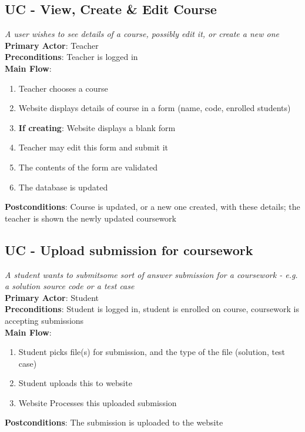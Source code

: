 \documentclass[a4paper,11pt]{report}
\begin{document}
\subsection*{UC - View, Create \& Edit Course}
\textit{A user wishes to see details of a course, possibly edit it, or create a new one}\\
\textbf{Primary Actor}: Teacher\\
\textbf{Preconditions}: Teacher is logged in\\
\textbf{Main Flow}:
\begin{enumerate}
\item Teacher chooses a course
\item Website displays details of course in a form (name, code, enrolled students)
\item \textbf{If creating}: Website displays a blank form
\item Teacher may edit this form and submit it
\item The contents of the form are validated
\item The database is updated
\end{enumerate}
\textbf{Postconditions}: Course is updated, or a new one created, with these details; the teacher is shown the newly updated coursework

\subsection*{UC - Upload submission for coursework}
\textit{A student wants to submitsome sort of answer submission for a coursework - e.g. a solution source code or a test case}\\
\textbf{Primary Actor}: Student\\
\textbf{Preconditions}: Student is logged in, student is enrolled on course, coursework is accepting submissions\\
\textbf{Main Flow}:
\begin{enumerate}
\item Student picks file(s) for submission, and the type of the file (solution, test case)
\item Student uploads this to website
\item Website Processes this uploaded submission
\end{enumerate}
\textbf{Postconditions}: The submission is uploaded to the website
\end{document}
